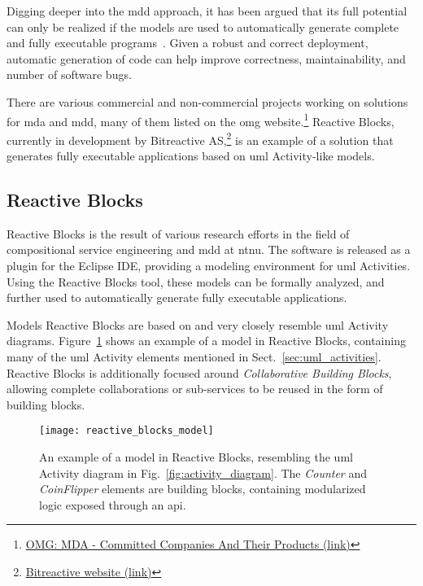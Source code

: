 \noindent
Digging deeper into the \gls{mdd} approach, it has been argued that its full potential can only be realized if the models are used to automatically generate complete and fully executable programs~\cite{selic:model_driven_development}. Given a robust and correct deployment, automatic generation of code can help improve correctness, maintainability, and number of software bugs.

\noindent
There are various commercial and non-commercial projects working on solutions for \gls{mda} and \gls{mdd}, many of them listed on the \gls{omg} website.\footnote{\href{http://www.omg.org/mda/committed-products.htm}{OMG: MDA - Committed Companies And Their Products (link)}} Reactive Blocks, currently in development by Bitreactive AS,\footnote{\href{http://www.bitreactive.com/}{Bitreactive website (link)}} is an example of a solution that generates fully executable applications based on \gls{uml} Activity-like models.

\subsection{Reactive Blocks}
\label{sec:reactive_blocks}
Reactive Blocks is the result of various research efforts in the field of compositional service engineering and \gls{mdd} at \gls{ntnu}\cite{kraemer:arctis_ramses}. The software is released as a plugin for the Eclipse IDE, providing a modeling environment for \gls{uml} Activities. Using the Reactive Blocks tool, these models can be formally analyzed, and further used to automatically generate fully executable applications.

\noindent
Models Reactive Blocks are based on and very closely resemble \gls{uml} Activity diagrams. Figure~\ref{fig:reactive_blocks_model} shows an example of a model in Reactive Blocks, containing many of the \gls{uml} Activity elements mentioned in Sect.~\ref{sec:uml_activities}. Reactive Blocks is additionally focused around \emph{Collaborative Building Blocks}, allowing complete collaborations or sub-services to be reused in the form of building blocks.

\begin{figure}[htp]
	\centering
	\texttt{[image: reactive\_blocks\_model]}
	\caption[Reactive Blocks model example]{An example of a model in Reactive Blocks, resembling the \gls{uml} Activity diagram in Fig.~\ref{fig:activity_diagram}. The \emph{Counter} and \emph{CoinFlipper} elements are building blocks, containing modularized logic exposed through an \gls{api}.}
	\label{fig:reactive_blocks_model}
\end{figure}

